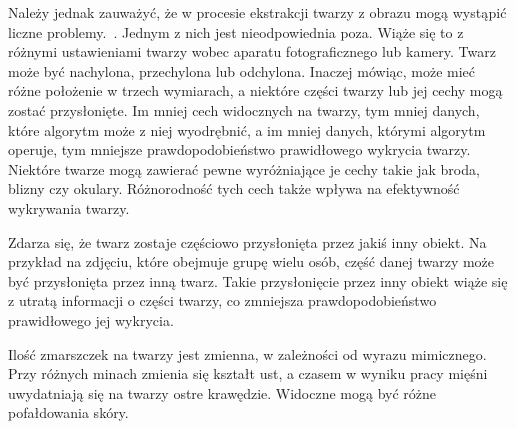 \documentclass[a4paper,twoside,12pt]{book}
\begin{document}
    Należy jednak zauważyć, że w procesie ekstrakcji twarzy z obrazu mogą wystąpić liczne problemy.~\cite{mehdiRizvi}.
    Jednym z nich jest nieodpowiednia poza.
    Wiąże się to z różnymi ustawieniami twarzy wobec aparatu fotograficznego lub kamery.
    Twarz może być nachylona, przechylona lub odchylona.
    Inaczej mówiąc, może mieć różne położenie w trzech wymiarach, a
    niektóre części twarzy lub jej cechy mogą zostać przysłonięte.
    Im mniej cech widocznych na twarzy, tym mniej danych, które algorytm może z niej wyodrębnić, a
    im mniej danych, którymi algorytm operuje, tym mniejsze prawdopodobieństwo prawidłowego wykrycia twarzy.
    Niektóre twarze mogą zawierać pewne wyróżniające je cechy takie jak broda, blizny czy okulary.
    Różnorodność tych cech także wpływa na efektywność wykrywania twarzy.

    Zdarza się, że twarz zostaje częściowo przysłonięta przez jakiś inny obiekt.
    Na przykład na zdjęciu,
    które obejmuje grupę wielu osób, część danej twarzy może być przysłonięta przez inną twarz.
    Takie przysłonięcie przez inny obiekt wiąże się z utratą informacji o części twarzy, co zmniejsza prawdopodobieństwo
    prawidłowego jej wykrycia.

    Ilość zmarszczek na twarzy jest zmienna, w zależności od wyrazu mimicznego.
    Przy różnych minach zmienia się kształt ust, a czasem w wyniku pracy mięśni uwydatniają się na twarzy ostre
    krawędzie.
    Widoczne mogą być różne pofałdowania skóry.
\end{document}
